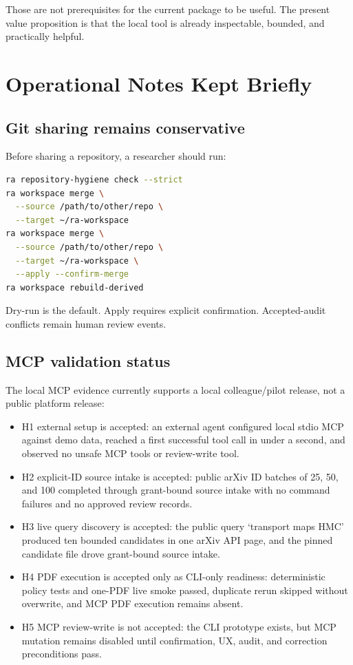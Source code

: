 \documentclass[11pt,a4paper,openany]{book}
\begin{document}
Those are not prerequisites for the current package to be useful. The present
value proposition is that the local tool is already inspectable, bounded, and
practically helpful.

\appendix
\chapter{Operational Notes Kept Briefly}

\section{Git sharing remains conservative}

Before sharing a repository, a researcher should run:

\begin{lstlisting}[language=bash]
ra repository-hygiene check --strict
ra workspace merge \
  --source /path/to/other/repo \
  --target ~/ra-workspace
ra workspace merge \
  --source /path/to/other/repo \
  --target ~/ra-workspace \
  --apply --confirm-merge
ra workspace rebuild-derived
\end{lstlisting}

Dry-run is the default. Apply requires explicit confirmation. Accepted-audit
conflicts remain human review events.

\section{MCP validation status}

The local MCP evidence currently supports a local colleague/pilot release, not a
public platform release:
\begin{itemize}[nosep]
  \item H1 external setup is accepted: an external agent configured local stdio
        MCP against demo data, reached a first successful tool call in under a
        second, and observed no unsafe MCP tools or review-write tool.
  \item H2 explicit-ID source intake is accepted: public arXiv ID batches of 25,
        50, and 100 completed through grant-bound source intake with no command
        failures and no approved review records.
  \item H3 live query discovery is accepted: the public query
        `transport maps HMC' produced ten bounded candidates in one arXiv API
        page, and the pinned candidate file drove grant-bound source intake.
  \item H4 PDF execution is accepted only as CLI-only readiness: deterministic
        policy tests and one-PDF live smoke passed, duplicate rerun skipped
        without overwrite, and MCP PDF execution remains absent.
  \item H5 MCP review-write is not accepted: the CLI prototype exists, but MCP
        mutation remains disabled until confirmation, UX, audit, and correction
        preconditions pass.
\end{itemize}
\end{document}
